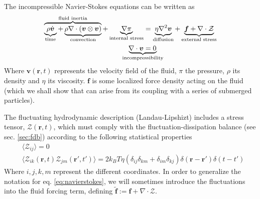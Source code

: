 \documentclass[ twoside,openright,titlepage,numbers=noenddot,%
headinclude,footinclude,cleardoublepage=empty,abstract=on,
BCOR=5mm,paper=a4,fontsize=11pt, dvipsnames
]{scrreprt}
\renewcommand{\vec}[1]{\bm{#1}}
\newcommand{\kT}{k_B T}
\newcommand{\fpos}{r}
\newcommand{\fvel}{v}
\begin{document}
The incompressible Navier-Stokes equations can be written as
\begin{equation}
  \label{eq:navierstokes}
  \begin{aligned}
    \overbrace{\underbrace{\rho\dot{\vec{\fvel}}}_{\text{time}} +\underbrace{\rho\nabla\cdot (\vec{\fvel}\otimes\vec{\fvel})}_{\text{convection}}}^{\text{fluid inertia}} + \underbrace{\nabla \pi}_{\text{internal stress}} &= \underbrace{\eta \nabla^2\vec{\fvel}}_{\text{diffusion}} + \underbrace{\vec{f} + \nabla\cdot \mathcal{Z}}_{\text{external stress}}\\
    \nabla\cdot\vec{\fvel} &= 0\quad\mathllap{\underbrace{\phantom{\nabla\cdot\vec{\fvel} = 0}}_{\text{incompressibility}}}
  \end{aligned}
\end{equation}
Where $\vec{\fvel}(\vec{\fpos}, t)$ represents the velocity field of the fluid, $\pi$ the pressure, $\rho$ its density and $\eta$ its viscosity. $\vec{f}$ is some localized force density acting on the fluid (which we shall show that can arise from its coupling with a series of submerged particles).

The fluctuating hydrodynamic description (Landau-Lipshizt) includes a stress tensor, $\mathcal{Z}(\vec{\fpos}, t)$, which must comply with the fluctuation-dissipation balance (see sec. \ref{sec:fdb}) according to the following statistical properties\cite{Zarate2006}
\begin{equation}
  \begin{aligned}
&  \langle \mathcal Z_{ij}\rangle = 0\\
&  \langle \mathcal Z_{ik}(\vec{\fpos},t)\mathcal Z_{jm}(\vec{\fpos}',t')\rangle = 2\kT\eta(\delta_{ij}\delta_{km} + \delta_{im}\delta_{kj})\delta(\vec{\fpos}-\vec{\fpos}')\delta(t-t')
\end{aligned}
\end{equation}
Where $i,j,k,m$ represent the different coordinates.
In order to generalize the notation for eq. \eqref{eq:navierstokes}, we will sometimes introduce the fluctuations into the fluid forcing term, defining $\tilde{\vec{f}} := \vec{f} + \nabla\cdot\mathcal{Z}$.
\end{document}
